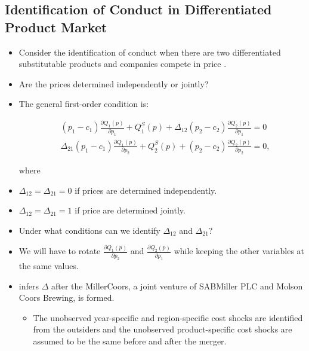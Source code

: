 \documentclass[]{book}
\providecommand{\tightlist}{%
  \setlength{\itemsep}{0pt}\setlength{\parskip}{0pt}}
\begin{document}
\subsection{Identification of Conduct in Differentiated Product
Market}\label{identification-of-conduct-in-differentiated-product-market}

\begin{itemize}
\item
  Consider the identification of conduct when there are two
  differentiated substitutable products and companies compete in price
  \citep{Nevo1998}.
\item
  Are the prices determined independently or jointly?
\item
  The general first-order condition is:

  \begin{equation}
  \begin{split}
  &(p_1 - c_1) \frac{\partial Q_1(p)}{\partial p_1} + Q_1^S(p) + \Delta_{12}(p_2 - c_2) \frac{\partial Q_2 (p)}{\partial p_1} = 0\\
  &\Delta_{21}(p_1 - c_1)\frac{\partial Q_1(p)}{\partial p_2} + Q_2^S(p) + (p_2 - c_2) \frac{\partial Q_2 (p)}{\partial p_2} = 0,
  \end{split}
  \end{equation}

  where
\item
  \(\Delta_{12} = \Delta_{21} = 0\) if prices are determined
  independently.
\item
  \(\Delta_{12} = \Delta_{21} = 1\) if price are determined jointly.
\item
  Under what conditions can we identify \(\Delta_{12}\) and
  \(\Delta_{21}\)?
\item
  We will have to rotate \(\frac{\partial Q_1(p)}{\partial p_2}\) and
  \(\frac{\partial Q_2 (p)}{\partial p_1}\) while keeping the other
  variables at the same values.
\item
  \citet{Miller2017} infers \(\Delta\) after the MillerCoors, a joint
  venture of SABMiller PLC and Molson Coors Brewing, is formed.

  \begin{itemize}
  \tightlist
  \item
    The unobserved year-specific and region-specific cost shocks are
    identified from the outsiders and the unobserved product-specific
    cost shocks are assumed to be the same before and after the merger.
  \end{itemize}
\end{itemize}
\end{document}
